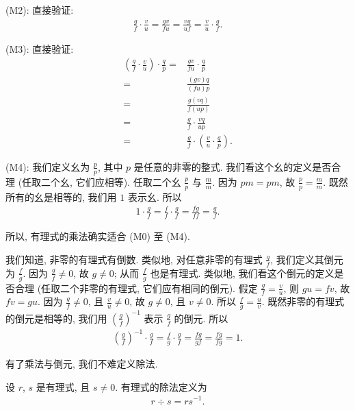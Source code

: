 (M2): 直接验证:
\begin{align*}
    \frac{g}{f} \cdot \frac{v}{u} = \frac{gv}{fu} = \frac{vg}{uf} = \frac{v}{u} \cdot \frac{g}{f}.
\end{align*}

(M3): 直接验证:
\begin{align*}
    \left( \frac{g}{f} \cdot \frac{v}{u} \right) \cdot \frac{q}{p}
    = {} & \frac{gv}{fu} \cdot \frac{q}{p}                                 \\
    = {} & \frac{(gv)q}{(fu)p}                                             \\
    = {} & \frac{g(vq)}{f(up)}                                             \\
    = {} & \frac{g}{f} \cdot \frac{vq}{up}                                 \\
    = {} & \frac{g}{f} \cdot \left( \frac{v}{u} \cdot \frac{q}{p} \right).
\end{align*}

(M4): 我们定义幺为 $\frac{p}{p}$, 其中 $p$ 是任意的非零的整式. 我们看这个幺的定义是否合理 (任取二个幺, 它们应相等). 任取二个幺 $\frac{p}{p}$ 与 $\frac{m}{m}$. 因为 $pm = pm$, 故 $\frac{p}{p} = \frac{m}{m}$. 既然所有的幺是相等的, 我们用 $1$ 表示幺. 所以
\begin{align*}
    1 \cdot \frac{g}{f} = \frac{f}{f} \cdot \frac{g}{f} = \frac{fg}{ff} = \frac{g}{f}.
\end{align*}

所以, 有理式的乘法确实适合 (M0) 至 (M4).

我们知道, 非零的有理式有倒数. 类似地, 对任意非零的有理式 $\frac{g}{f}$, 我们定义其倒元为 $\frac{f}{g}$. 因为 $\frac{g}{f} \neq 0$, 故 $g \neq 0$; 从而 $\frac{f}{g}$ 也是有理式. 类似地, 我们看这个倒元的定义是否合理 (任取二个非零的有理式, 它们应有相同的倒元). 假定 $\frac{g}{f} = \frac{v}{u}$, 则 $gu = fv$, 故 $fv = gu$. 因为 $\frac{g}{f} \neq 0$, 且 $\frac{v}{u} \neq 0$, 故 $g \neq 0$, 且 $v \neq 0$. 所以 $\frac{f}{g} = \frac{u}{v}$. 既然非零的有理式的倒元是相等的, 我们用 $\left( \frac{g}{f} \right)^{-1}$ 表示 $\frac{g}{f}$ 的倒元. 所以
\begin{align*}
    \left( \frac{g}{f} \right)^{-1} \cdot \frac{g}{f} = \frac{f}{g} \cdot \frac{g}{f} = \frac{fg}{gf} = \frac{fg}{fg} = 1.
\end{align*}

有了乘法与倒元, 我们不难定义除法.

\begin{definition}
    设 $r$, $s$ 是有理式, 且 $s \neq 0$. 有理式的除法定义为
    \begin{align*}
        r \div s = rs^{-1}.
    \end{align*}
\end{definition}

